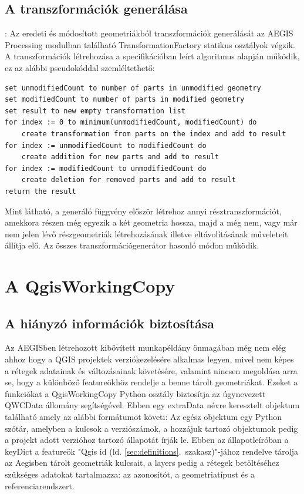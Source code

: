 \subsection{A transzformációk generálása}:
Az eredeti és módosított geometriákból transzformációk generálását az AEGIS Processing modulban található TransformationFactory statikus osztályok végzik.
A transzformációk létrehozása a specifikációban leírt algoritmus alapján működik, ez az alábbi pseudokóddal szemléltethető:
\begin{lstlisting}[language={[Sharp]C}]
set unmodifiedCount to number of parts in unmodified geometry
set modifiedCount to number of parts in modified geometry
set result to new empty transformation list
for index := 0 to minimum(unmodifiedCount, modifiedCount) do
	create transformation from parts on the index and add to result
for index := unmodifiedCount to modifiedCount do
	create addition for new parts and add to result
for index := modifiedCount to unmodifiedCount do
	create deletion for removed parts and add to result
return the result
\end{lstlisting}
Mint látható, a generáló függvény először létrehoz annyi résztranszformációt, amekkora részen még egyezik a két geometria hossza, majd a még nem, vagy már nem jelen lévő részgeometriák létrehozásának illetve eltávolításának műveleteit állítja elő. Az összes transzformációgenerátor hasonló módon működik.

\section{A QgisWorkingCopy}
\subsection{A  hiányzó információk biztosítása}
Az AEGISben létrehozott kibővített munkapéldány önmagában még nem elég ahhoz hogy a QGIS projektek verziókezelésére alkalmas legyen, mivel nem képes a rétegek adatainak és változásainak követésére, valamint nincsen megoldása arra se, hogy a különböző featureökhöz rendelje a benne tárolt geometriákat. Ezeket a funkciókat a QgisWorkingCopy Python osztály biztosítja az úgynevezett QWCData állomány segítségével. Ebben egy extraData névre keresztelt objektum található amely az alábbi formátumot követi:
Az egész objektum egy Python szótár, amelyben a kulcsok a verziószámok, a hozzájuk tartozó objektumok pedig a projekt adott verzióhoz tartozó állapotát írják le. Ebben az állapotleíróban a keyDict a featureök "Qgis id (ld. \ref{sec:definitions}.~szakasz)"-jához rendelve tárolja az Aegisben tárolt geometriák kulcsait, a layers pedig a rétegek betöltéséhez szükséges adatokat tartalmazza: az azonosítót, a geometriatípust és a referenciarendszert.
